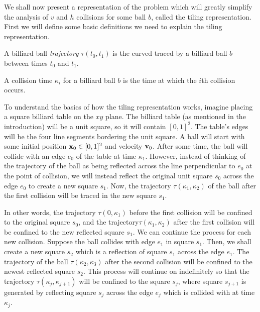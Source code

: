 We shall now present a representation of the problem which will greatly simplify the analysis of $v$ and $h$ collisions for some ball $b$, called the tiling representation. First we will define some basic definitions we need to explain the tiling representation.

\begin{definition}
  A billiard ball \emph{trajectory} $\tau(t_0, t_1)$ is the curved traced by a billiard ball $b$ between times $t_0$ and $t_1$.
\end{definition}

\begin{definition}
  A collision time $\kappa_i$ for a billiard ball $b$ is the time at which the $i$th collision occurs.
\end{definition}

To understand the basics of how the tiling representation works, imagine placing a square billiard table on the $xy$ plane. The billiard table (as mentioned in the introduction) will be a unit square, so it will contain $[0,1]^2$. The table's edges will be the four line segments bordering the unit square. A ball will start with some initial position $\mathbf{x}_0 \in [0,1]^2$ and velocity $\mathbf{v}_0$. After some time, the ball will collide with an edge $e_0$ of the table at time $\kappa_1$. However, instead of thinking of the trajectory of the ball as being reflected across the line perpendicular to $e_0$ at the point of collision, we will instead reflect the original unit square $s_0$ across the edge $e_0$ to create a new square $s_1$. Now, the trajectory $\tau(\kappa_1, \kappa_2)$ of the ball after the first collision will be traced in the new square $s_1$.

In other words, the trajectory $\tau(0, \kappa_1)$ before the first collision will be confined to the original square $s_0$, and the trajectory$\tau(\kappa_1, \kappa_2)$ after the first collision will be confined to the new reflected square $s_1$. We can continue the process for each new collision. Suppose the ball collides with edge $e_1$ in square $s_1$. Then, we shall create a new square $s_2$ which is a reflection of square $s_1$ across the edge $e_1$. The trajectory of the ball $\tau(\kappa_2, \kappa_3)$ after the second collision will be confined to the newest reflected square $s_2$. This process will continue on indefinitely so that the trajectory $\tau(\kappa_j, \kappa_{j+1})$ will be confined to the square $s_j$, where square $s_{j+1}$ is generated by reflecting square $s_{j}$ across the edge $e_{j}$ which is collided with at time $\kappa_j$.

